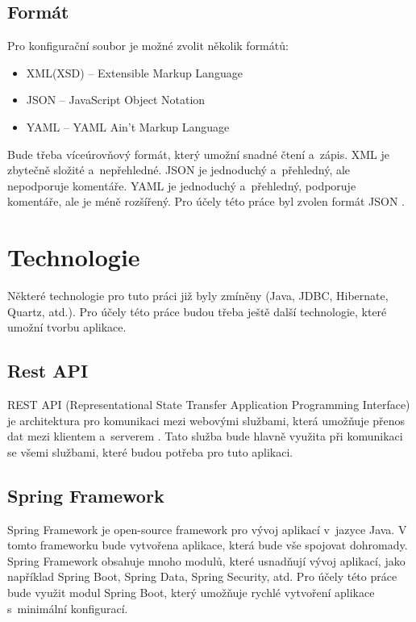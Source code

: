 \documentclass[czech, kiv, ba, he, iso690alph, pdf]{fasthesis}
\begin{document}
\section{Formát}
Pro konfigurační soubor je možné zvolit několik formátů:
\begin{itemize}
    \item XML(XSD) -- Extensible Markup Language
    \item JSON -- JavaScript Object Notation
    \item YAML -- YAML Ain't Markup Language
\end{itemize}
Bude třeba víceúrovňový formát, který umožní snadné čtení a~zápis.
XML je zbytečně složité a~nepřehledné.
JSON je jednoduchý a~přehledný, ale nepodporuje komentáře.
YAML je jednoduchý a~přehledný, podporuje komentáře, ale je méně rozšířený.
Pro účely této práce byl zvolen formát JSON \cite{cisco_xml_json_yaml}.

\chapter{Technologie}
Některé technologie pro tuto práci již byly zmíněny (Java, JDBC, Hibernate, Quartz, atd.).
Pro účely této práce budou třeba ještě další technologie, které umožní tvorbu aplikace.

\section{Rest API}
REST API (Representational State Transfer Application Programming Interface) je architektura pro komunikaci mezi webovými službami,
která umožňuje přenos dat mezi klientem a~serverem \cite{rest_api}.
Tato služba bude hlavně využita při komunikaci se všemi službami, které budou potřeba pro tuto aplikaci.

\section{Spring Framework}
Spring Framework je open-source framework pro vývoj aplikací v~jazyce Java.
V tomto frameworku bude vytvořena aplikace, která bude vše spojovat dohromady.
Spring Framework obsahuje mnoho modulů, které usnadňují vývoj aplikací, 
jako například Spring Boot, Spring Data, Spring Security, atd.
Pro účely této práce bude využit modul Spring Boot, který umožňuje rychlé 
vytvoření aplikace s~minimální konfigurací.
\cite{spring_framework}

\pagebreak
\end{document}
